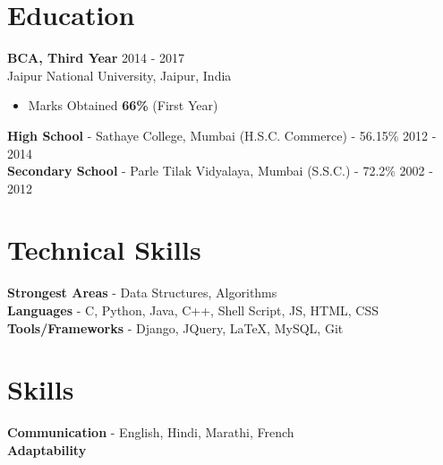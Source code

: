 \documentclass[line, margin]{res}
\begin{document}
\address{S.V.Road \\ Andheri, Mumbai 400058 \\ +91-9920945449}
 
\begin{resume}
\section{Education}
\textbf{BCA, Third Year} \hfill 2014 - 2017 \\
{Jaipur National University, Jaipur, India}
\begin{itemize}
 \item Marks Obtained \textbf{66\%} (First Year)
\end{itemize}
\textbf{High School} - {Sathaye College, Mumbai} (H.S.C. Commerce) - 56.15\% \hfill 2012 - 2014 \\
\textbf{Secondary School} - Parle Tilak Vidyalaya, Mumbai (S.S.C.) - 72.2\% \hfill 2002 - 2012
 
\section{Technical Skills}
\textbf{Strongest Areas} - Data Structures, Algorithms \\
\textbf{Languages} - C, Python, Java, C++, Shell Script, JS, HTML, CSS\\
\textbf{Tools/Frameworks} - Django, JQuery, \LaTeX, MySQL, Git

\section{Skills}
\textbf{Communication} - English, Hindi, Marathi, French \\
\textbf{Adaptability}
 

\end{resume}
\end{document}
